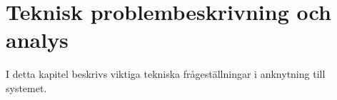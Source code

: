 \chapter{Teknisk problembeskrivning och analys}
I detta kapitel beskrivs viktiga tekniska frågeställningar i anknytning till systemet.













